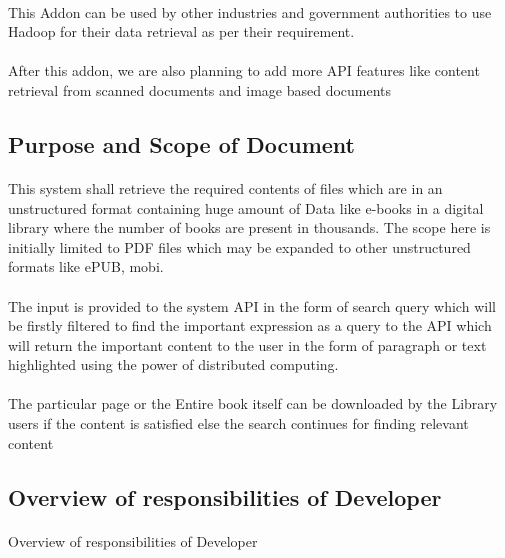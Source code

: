 \documentclass[oneside,a4paper,12pt]{report}
\begin{document}
\paragraph{}
This Addon can be used by other industries and government authorities to use Hadoop for their data retrieval as per their requirement. 

\paragraph{}
After this addon, we are also planning to add more API features like content retrieval from scanned documents and image based documents

\subsection{Purpose and Scope of Document}
\paragraph{}
This system shall retrieve the required contents of files which are in an unstructured format containing huge amount of Data like e-books in a digital library where the number of books are present in thousands. The scope here is initially limited to PDF files which may be expanded to other unstructured formats like ePUB, mobi.  

\paragraph{}
The input is provided to the system API in the form of search query which will be firstly filtered to find the important expression as a query to the API which will return the important content to the user in the form of paragraph or text highlighted using the power of distributed computing. 

\paragraph{}
The particular page or the Entire book itself can be downloaded by the Library users if the content is satisfied else the search continues for finding relevant content 

\subsection{Overview of responsibilities of Developer}
\paragraph{}
Overview of responsibilities of Developer
\end{document}
